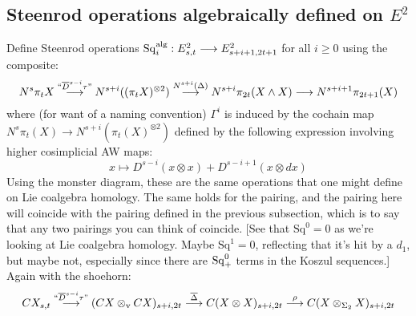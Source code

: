 \documentclass[10pt]{article}
\newcommand{\SqShift}{\Sq_{\smash{+}}}
\newcommand{\Sq}{\mathrm{Sq}}
\begin{document}
\begin{Adams sseq operations old version}
\subsection{Steenrod operations algebraically defined on $E^2$}
Define Steenrod operations $\Sq^\textup{alg}_i:E^2_{s,t}\to E^2_{s+i+1,2t+1}$ for all $i\geq 0$ using the composite:
\[N^s\pi_tX\overset{\textup{``}\overline{D}^{s-i}\circ\tau\textup{''}}{\to}N^{s+i}((\pi_tX)^{\otimes2})\overset{N^{s+i}(\Delta)}{\to}N^{s+i}\pi_{2t}(X\wedge X)\to N^{s+i+1}\pi_{2t+1}(X)\]
where (for want of a naming convention) $\Gamma^i$ is induced by the cochain map $N^s\pi_t(X)\to N^{s+i}(\pi_t(X)^{\otimes 2})$ defined by the following expression involving higher cosimplicial AW maps:
\[x\mapsto D^{s-i}(x\otimes x)+D^{s-i+1}(x\otimes dx)\]
Using the monster diagram, these are the same operations that one might define on Lie coalgebra homology. The same holds for the pairing, and the pairing here will coincide with the pairing defined in the previous subsection, which is to say that any two pairings you can think of coincide.
[{See that $\Sq^0=0$ as we're looking at Lie coalgebra homology.} Maybe $\Sq^1=0$, reflecting that it's hit by a $d_1$, but maybe not, especially since there are $\SqShift^0$ terms in the Koszul sequences.]
Again with the shoehorn:
\[CX_{s,t}\overset{\textup{``}\overline{D}^{s-i}\circ\tau\textup{''}}{\to} (CX\otimes_\textup{v}CX)_{s+i,2t} \overset{\overline{\Delta}}{\to}C(X\otimes X)_{s+i,2t}\overset{\rho}{\to}C(X\otimes_{\Sigma_2} X)_{s+i,2t}\]


\end{Adams sseq operations old version}
\end{document}
